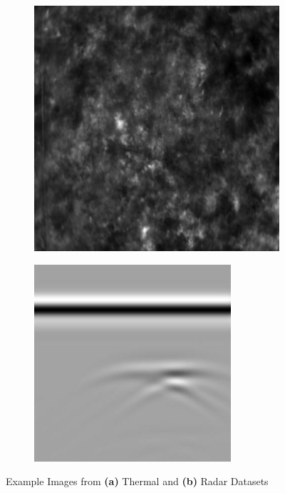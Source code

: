 \begin{figure}[htbp]
  \centering
  \begin{subfigure}[t]{0.48\textwidth}
    \centering
    \includegraphics[width=\textwidth]{figs/Rory/A_thermal_image.jpg} %
    \caption{ }
    \label{fig:thermal_example}
  \end{subfigure}
  \hfill
  \begin{subfigure}[t]{0.48\textwidth}
    \centering
    \includegraphics[width=\textwidth]{figs/Rory/A_radar_image.jpg} %
    \caption{ }
    \label{fig:radar_example}
  \end{subfigure}
  \caption{Example Images from \textbf{(a)} Thermal and \textbf{(b)} Radar Datasets}
  \label{fig:dataset_examples}
\end{figure}

